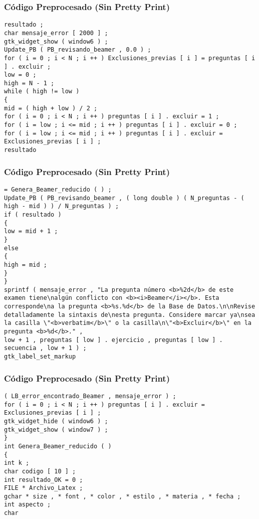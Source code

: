 \documentclass{beamer}
\begin{document}
\begin{frame}[fragile]
\frametitle{C\'odigo Preprocesado (Sin Pretty Print)}
\begin{lstlisting}[style=CStyle]
resultado ; 
char mensaje_error [ 2000 ] ; 
gtk_widget_show ( window6 ) ; 
Update_PB ( PB_revisando_beamer , 0.0 ) ; 
for ( i = 0 ; i < N ; i ++ ) Exclusiones_previas [ i ] = preguntas [ i ] . excluir ; 
low = 0 ; 
high = N - 1 ; 
while ( high != low ) 
{ 
mid = ( high + low ) / 2 ; 
for ( i = 0 ; i < N ; i ++ ) preguntas [ i ] . excluir = 1 ; 
for ( i = low ; i <= mid ; i ++ ) preguntas [ i ] . excluir = 0 ; 
for ( i = low ; i <= mid ; i ++ ) preguntas [ i ] . excluir = Exclusiones_previas [ i ] ; 
resultado \end{lstlisting}
\end{frame}
\begin{frame}[fragile]
\frametitle{C\'odigo Preprocesado (Sin Pretty Print)}
\begin{lstlisting}[style=CStyle]
= Genera_Beamer_reducido ( ) ; 
Update_PB ( PB_revisando_beamer , ( long double ) ( N_preguntas - ( high - mid ) ) / N_preguntas ) ; 
if ( resultado ) 
{ 
low = mid + 1 ; 
} 
else 
{ 
high = mid ; 
} 
} 
sprintf ( mensaje_error , "La pregunta número <b>%2d</b> de este examen tiene\nalgún conflicto con <b><i>Beamer</i></b>. Esta corresponde\na la pregunta <b>%s.%d</b> de la Base de Datos.\n\nRevise detalladamente la sintaxis de\nesta pregunta. Considere marcar ya\nsea la casilla \"<b>verbatim</b>\" o la casilla\n\"<b>Excluir</b>\" en la pregunta <b>%d</b>." , 
low + 1 , preguntas [ low ] . ejercicio , preguntas [ low ] . secuencia , low + 1 ) ; 
gtk_label_set_markup \end{lstlisting}
\end{frame}
\begin{frame}[fragile]
\frametitle{C\'odigo Preprocesado (Sin Pretty Print)}
\begin{lstlisting}[style=CStyle]
( LB_error_encontrado_Beamer , mensaje_error ) ; 
for ( i = 0 ; i < N ; i ++ ) preguntas [ i ] . excluir = Exclusiones_previas [ i ] ; 
gtk_widget_hide ( window6 ) ; 
gtk_widget_show ( window7 ) ; 
} 
int Genera_Beamer_reducido ( ) 
{ 
int k ; 
char codigo [ 10 ] ; 
int resultado_OK = 0 ; 
FILE * Archivo_Latex ; 
gchar * size , * font , * color , * estilo , * materia , * fecha ; 
int aspecto ; 
char \end{lstlisting}
\end{frame}
\end{document}
